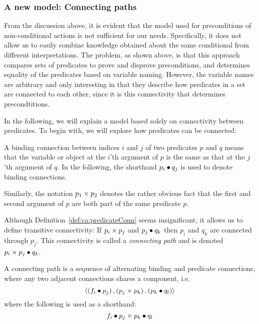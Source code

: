 \documentclass[\master/Master.tex]{subfiles}
\begin{document}
\subsubsection{A new model: Connecting paths}
From the discussion above, it is evident that the model used for preconditions of non-conditional actions is not sufficient for our needs. Specifically, it does not allow us to easily combine knowledge obtained about the same conditional from different interpretations. 
The problem, as shown above, is that this approach compares sets of predicates to prove and disprove preconditions, and determines equality of the predicates based on variable naming. However, the variable names are arbitrary and only interesting in that they describe how predicates in a set are connected to each other, since it is this connectivity that determines precondtitions.

In the following, we will explain a model based solely on connectivity between predicates. To begin with, we will explore how predicates can be connected:

\begin{definition}\label{def:ca:bindingConn}
    A binding connection between indices $i$ and $j$ of two predicates $p$ and $q$ means that the variable or object at the $i$'th argument of $p$ is the same as that at the $j$'th argument of $q$. In the following, the shorthand $p_i \bullet q_j$ is used to denote binding connections.
\end{definition}

\begin{definition}\label{def:ca:predicateConn}
    Similarly, the notation $p_1 \times p_2$ denotes the rather obvious fact that the first and second argument of $p$ are both part of the same predicate $p$.
\end{definition}

Although Definition~\ref{def:ca:predicateConn} seems insignificant, it allows us to define transitive connectivity: If $p_i \times p_j$ and $p_j \bullet q_k$ then $p_i$ and $q_k$ are connected through $p_j$. This connectivity is called a \emph{connecting path} and is denoted $p_i \times p_j \bullet q_k$.

\begin{definition}\label{def:ca:connectingPath}
    A connecting path is a sequence of alternating binding and predicate connections, where any two adjacent connections shares a component, i.e.\
    \begin{equation*}
        \left< 
            \left( f_i \bullet p_j \right), 
            \left( p_j \times p_k \right), 
            \left( p_k \bullet q_l \right) 
        \right>
    \end{equation*}
    where the following is used as a shorthand:
    \begin{equation*}
        f_i \bullet p_j \times p_k \bullet q_l
    \end{equation*}
\end{definition}
\end{document}
